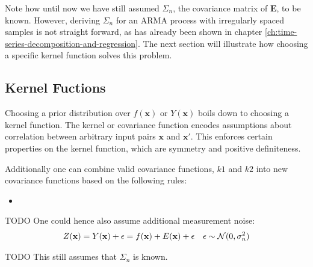 Note how until now we have still assumed $\Sigma_n$, the covariance matrix of $\mathbf{E}$, to be known.
However, deriving $\Sigma_n$ for an ARMA process with irregularly spaced samples is not straight forward, as has already
been shown in chapter \ref{ch:time-series-decomposition-and-regression}. The next section will illustrate how choosing a
specific kernel function solves this problem.

\subsection{Kernel Fuctions}\label{subsec:kernel}

Choosing a prior distribution over $f(\mathbf{x})$ or $Y(\mathbf{x})$ boils down to choosing a kernel function.
The kernel or covariance function encodes assumptions about correlation between arbitrary input pairs $\mathbf{x}$ and $\mathbf{x}'$.
This enforces certain properties on the kernel function, which are symmetry and positive definiteness.
%
%

Additionally one can combine valid covariance functions, $k1$ and $k2$ into new covariance functions based on the following rules:
\begin{itemize}
    \item
\end{itemize}







TODO
One could hence also assume additional measurement noise:
\begin{align*}
    Z(\mathbf{x}) = Y(\mathbf{x}) + \epsilon = f(\mathbf{x}) + E(\mathbf{x}) + \epsilon  && \epsilon \sim \operatorname{\mathcal{N}}(0, \sigma_n^{2})
\end{align*}




TODO
This still  assumes that $\Sigma_n$ is known.



